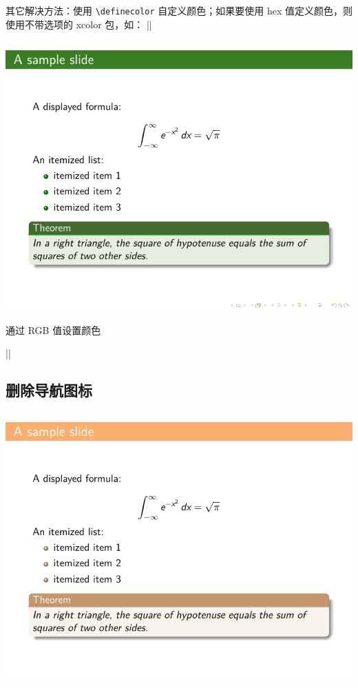 \begin{column}{0.5\textwidth}
\begin{remark*}
  其它解决方法：使用 \verb|\definecolor| 自定义颜色；如果要使用 hex 值定义颜色，则使用不带选项的 xcolor 包，如：
  ||
\end{remark*}



\inputminted[linenos=true]{latex}{examples/beamer/theme-customize.tex}

\includegraphics{examples/beamer/theme-customize.pdf}

通过 RGB 值设置颜色

|| 

\subsection{删除导航图标}

\inputminted[linenos=true]{latex}{examples/beamer/theme-remove-navigation-symbols.tex}

\includegraphics{examples/beamer/theme-remove-navigation-symbols.pdf}


\end{column}
